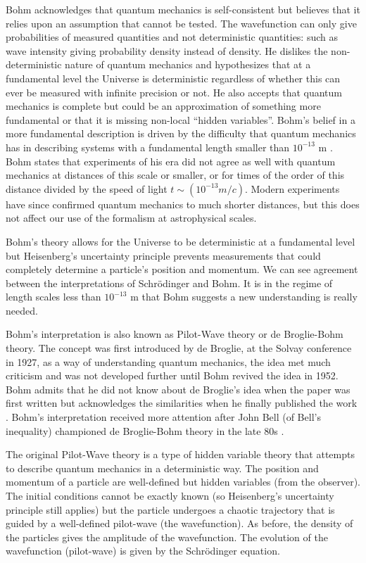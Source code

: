 Bohm acknowledges that quantum mechanics is self-consistent but believes that it relies upon an assumption that cannot be tested. The wavefunction can only give probabilities of measured quantities and not deterministic quantities: such as wave intensity giving probability density instead of density. He dislikes the non-deterministic nature of quantum mechanics and hypothesizes that at a fundamental level the Universe is deterministic regardless of whether this can ever be measured with infinite precision or not. He also accepts that quantum mechanics is complete but could be an approximation of something more fundamental or that it is missing non-local ``hidden variables''. Bohm's belief in a more fundamental description is driven by the difficulty that quantum mechanics has in describing systems with a fundamental length smaller than $10^{-13}$ m \citep{bib_bohm, bib_bohm2}.
Bohm states that experiments of his era did not agree as well with quantum mechanics at distances of this scale or smaller, or for times of the order of this distance divided by the speed of light $t\sim (10^{-13} m/ c)$. Modern experiments have since confirmed quantum mechanics to much shorter distances, but this does not affect our use of the formalism at astrophysical scales.

Bohm's theory allows for the Universe to be deterministic at a fundamental level but Heisenberg's uncertainty principle prevents measurements that could completely determine a particle's position and momentum. We can see agreement between the interpretations of Schr\"odinger and Bohm. It is in the regime of length scales less than $10^{-13}$ m that Bohm suggests a new understanding is really needed.

Bohm's interpretation is also known as Pilot-Wave theory or de Broglie-Bohm theory. The concept was first introduced by de Broglie, at the Solvay conference in 1927, as a way of understanding quantum mechanics, the idea met much criticism and was not developed further until Bohm revived the idea in 1952. Bohm admits that he did not know about de Broglie's idea when the paper was first written but acknowledges the similarities when he finally published the work \citep{bib_bohm, bib_bohm2}. Bohm's interpretation received more attention after John Bell (of Bell's inequality) championed de Broglie-Bohm theory in the late 80s \citep{bib_bell}.

The original Pilot-Wave theory is a type of hidden variable theory that attempts to describe quantum mechanics in a deterministic way. The position and momentum of a particle are well-defined but hidden variables (from the observer). The initial conditions cannot be exactly known (so Heisenberg's uncertainty principle still applies) but the particle undergoes a chaotic trajectory that is guided by a well-defined pilot-wave (the wavefunction). As before, the density of the particles gives the amplitude of the wavefunction. The evolution of the wavefunction (pilot-wave) is given by the Schr\"odinger equation.

